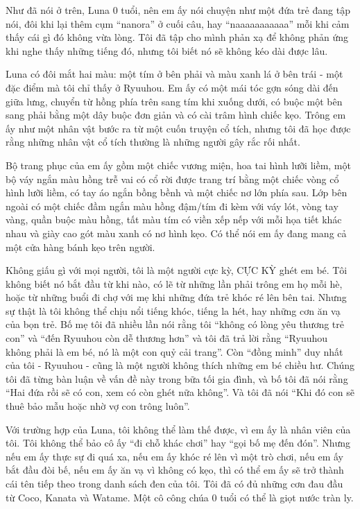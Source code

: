 \documentclass[../main.tex]{subfiles}
\begin{document}
Như đã nói ở trên, Luna 0 tuổi, nên em ấy nói chuyện như một đứa trẻ đang tập nói, đôi khi lại thêm cụm ``nanora'' ở cuối câu, hay ``naaaaaaaaaaa'' mỗi khi cảm thấy cái gì đó không vừa lòng. Tôi đã tập cho mình phản xạ để không phản ứng khi nghe thấy những tiếng đó, nhưng tôi biết nó sẽ không kéo dài được lâu.

Luna có đôi mắt hai màu: một tím ở bên phải và màu xanh lá ở bên trái - một đặc điểm mà tôi chỉ thấy ở Ryuuhou. Em ấy có một mái tóc gợn sóng dài đến giữa lưng, chuyển từ hồng phía trên sang tím khi xuống dưới, có buộc một bên sang phải bằng một dây buộc đơn giản và có cài trâm hình chiếc kẹo. Trông em ấy như một nhân vật bước ra từ một cuốn truyện cổ tích, nhưng tôi đã học được rằng những nhân vật cổ tích thường là những người gây rắc rối nhất.

Bộ trang phục của em ấy gồm một chiếc vương miện, hoa tai hình lưỡi liềm, một bộ váy ngắn màu hồng trễ vai có cổ rời được trang trí bằng một chiếc vòng cổ hình lưỡi liềm, có tay áo ngắn bồng bềnh và một chiếc nơ lớn phía sau. Lớp bên ngoài có một chiếc đầm ngắn màu hồng đậm/tím đi kèm với váy lót, vòng tay vàng, quần buộc màu hồng, tất màu tím có viền xếp nếp với mỗi họa tiết khác nhau và giày cao gót màu xanh có nơ hình kẹo. Có thể nói em ấy đang mang cả một cửa hàng bánh kẹo trên người.

\chrint

Không giấu gì với mọi người, tôi là một người cực kỳ, CỰC KỲ ghét em bé. Tôi không biết nó bắt đầu từ khi nào, có lẽ từ những lần phải trông em họ mỗi hè, hoặc từ những buổi đi chợ với mẹ khi những đứa trẻ khóc ré lên bên tai. Nhưng sự thật là tôi không thể chịu nổi tiếng khóc, tiếng la hét, hay những cơn ăn vạ của bọn trẻ. Bố mẹ tôi đã nhiều lần nói rằng tôi ``không có lòng yêu thương trẻ con'' và ``đến Ryuuhou còn dễ thương hơn'' và tôi đã trả lời rằng ``Ryuuhou không phải là em bé, nó là một con quỷ cải trang''. Còn ``đồng minh'' duy nhất của tôi - Ryuuhou - cũng là một người không thích những em bé chiều hư. Chúng tôi đã từng bàn luận về vấn đề này trong bữa tối gia đình, và bố tôi đã nói rằng ``Hai đứa rồi sẽ có con, xem có còn ghét nữa không''. Và tôi đã nói ``Khi đó con sẽ thuê bảo mẫu hoặc nhờ vợ con trông luôn''.

Với trường hợp của Luna, tôi không thể làm thế được, vì em ấy là nhân viên của tôi. Tôi không thể bảo cô ấy ``đi chỗ khác chơi'' hay ``gọi bố mẹ đến đón''. Nhưng nếu em ấy thực sự đi quá xa, nếu em ấy khóc ré lên vì một trò chơi, nếu em ấy bắt đầu đòi bế, nếu em ấy ăn vạ vì không có kẹo, thì có thể em ấy sẽ trở thành cái tên tiếp theo trong danh sách đen của tôi. Tôi đã có đủ những cơn đau đầu từ Coco, Kanata và Watame. Một cô công chúa 0 tuổi có thể là giọt nước tràn ly.
\end{document}
